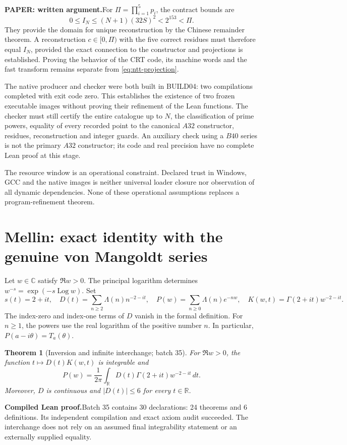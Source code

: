 \documentclass[11pt,a4paper]{article}
\newtheorem{theorem}{Theorem}[section]
\theoremstyle{remark}
\newcommand{\Lam}{\Lambda}
\newcommand{\C}{\mathbb C}
\newcommand{\R}{\mathbb R}
\newcommand{\paid}{\textbf{Compiled Lean proof.}\space}
\newcommand{\paper}{\textbf{PAPER: written argument.}\space}
\DeclareMathOperator{\Log}{Log}
\begin{document}
\paper For $\Pi=\prod_{i=1}^5p_i$, the contract bounds are
\begin{equation}\label{eq:crt-size}
0\le I_N\le(N+1)(32S)^2<2^{153}<\Pi.
\end{equation}
They provide the domain for unique reconstruction by the Chinese remainder
theorem. A reconstruction $c\in[0,\Pi)$ with the five correct residues must
therefore equal $I_N$, provided the exact connection to the constructor and
projections is established. Proving the behavior of the CRT code, its machine
words and the fast transform remains separate from \eqref{eq:ntt-projection}.

The native producer and checker were both built in BUILD04: two compilations
completed with exit code zero. This establishes the existence of two frozen
executable images without proving their refinement of the Lean functions.
The checker must still certify the entire catalogue up to $N$, the
classification of prime powers, equality of every recorded point to the
canonical $A32$ constructor, residues, reconstruction and integer guards.
An auxiliary check using a $B40$ series is not the primary $A32$ constructor;
its code and real precision have no complete Lean proof at this stage.

The resource window is an operational constraint. Declared trust in Windows,
GCC and the native images is neither universal loader closure nor observation
of all dynamic dependencies. None of these operational assumptions replaces
a program-refinement theorem.

\clearpage
\section{Mellin: exact identity with the genuine von Mangoldt series}\label{sec:mellin}
Let $w\in\C$ satisfy $\Re w>0$. The principal logarithm determines
$w^{-s}=\exp(-s\Log w)$. Set
\begin{equation}\label{eq:mellin-objects}
s(t)=2+it,\quad
D(t)=\sum_{n\ge2}\Lam(n)n^{-2-it},\quad
P(w)=\sum_{n\ge0}\Lam(n)e^{-nw},\quad
K(w,t)=\Gamma(2+it)w^{-2-it}.
\end{equation}
The index-zero and index-one terms of $D$ vanish in the formal definition.
For $n\ge1$, the powers use the real logarithm of the positive number $n$.
In particular, $P(a-i\theta)=T_a(\theta)$.

\begin{theorem}[Inversion and infinite interchange; batch 35]\label{thm:mellin}
For $\Re w>0$, the function $t\mapsto D(t)K(w,t)$ is integrable and
\begin{equation}\label{eq:mellin}
P(w)=\frac1{2\pi}\int_{\R}D(t)\Gamma(2+it)w^{-2-it}\,dt.
\end{equation}
Moreover, $D$ is continuous and $|D(t)|\le6$ for every $t\in\R$.
\end{theorem}
\paid Batch 35 contains 30 declarations: 24 theorems and 6 definitions.
Its independent compilation and exact axiom audit succeeded. The interchange
does not rely on an assumed final integrability statement or an externally
supplied equality.
\end{document}
